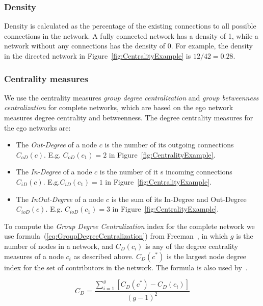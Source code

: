 \subsubsection{Density}
Density is calculated as the percentage of the existing connections to all
possible connections in the network. A fully connected network has a density of
1, while a network without any connections has the density of 0. For example, the
density in the directed network in Figure~\ref{fig:CentralityExample} is
$12/42=0.28$.

\subsubsection{Centrality measures}
We use the centrality measures \emph{group degree centralization} and
\emph{group betweenness centralization} for complete networks, which are based on
the ego network measures degree centrality and betweenness. The degree
centrality measures for the ego networks are:

\begin{itemize}
  \item The \emph{Out-Degree} of a node $c$ is the
  number of its outgoing connections $C_{oD}(c)$. E.g. $C_{oD}(c_1)=2$ in 
  Figure~\ref{fig:CentralityExample}.
  
  \item The \emph{In-Degree} of a node $c$ is the
  number of it s incoming connections $C_{iD}(c)$. E.g.$C_{iD}(c_1)=1$ 
  in Figure~\ref{fig:CentralityExample}.
  
  \item The \emph{InOut-Degree} of a node $c$ is the sum of its In-Degree and
  Out-Degree $C_{ioD}(c)$. E.g. $C_{ioD}(c_1)=3$
  in Figure~\ref{fig:CentralityExample}.
\end{itemize}

To compute the \emph{Group Degree Centralization} index for the complete network
we use formula~(\ref{eq:GroupDegreeCentralization}) from
Freeman~\cite{Freeman:1979rl}, in which $g$ is the number of nodes in a network,
and $C_D(c_i)$ is any of the degree centrality measures of a node $c_i$ as
described above. $C_D(c^*)$ is the largest node degree index for the set of
contributors in the network. The formula is also used
by~\cite{Gloor:2003cikm,hinds:cscw:2006}.

\begin{equation}
\displaystyle C_D =  \frac{\sum_{i=1}^g[C_D(c^*) - C_D(c_i)]}{(g-1)^2}
\label{eq:GroupDegreeCentralization}
\end{equation}

